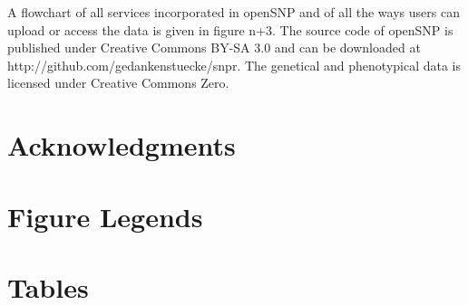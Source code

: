\documentclass[10pt]{article}
\begin{document}
A flowchart of all services incorporated in openSNP and of all the ways users can upload or access the data is given in figure n+3. The source code of openSNP is published under Creative Commons BY-SA 3.0 and can be downloaded at http://github.com/gedankenstuecke/snpr. The genetical and phenotypical data is licensed under Creative Commons Zero. 
\section*{Acknowledgments}




\section*{Figure Legends}


\section*{Tables}
\end{document}
